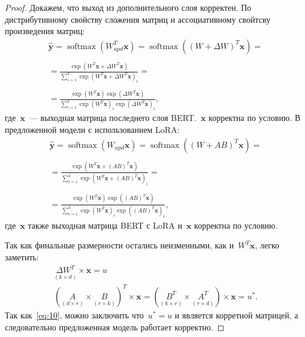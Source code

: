 \begin{proof} 
Докажем, что выход из дополнительного слоя корректен. По дистрибутивному свойству сложения матриц и ассоциативному свойтсву произведения матриц: 
\begin{equation}
\label{eq:9}
\begin{aligned}
\hat{\mathbf{y}} = \operatorname{softmax}\left(W_{upd}^T \mathbf{x}\right) =
\operatorname{softmax}\left((W + \Delta W)^T \mathbf{x}\right) =\\ \\
= \frac{\exp \left(W^T \mathbf{x} + \Delta W^T \mathbf{x}\right)}{\sum_{i=1}^k \exp \left(W^T \mathbf{x} + \Delta W^T \mathbf{x}\right)_i}=\\ \\
= \frac{\exp \left(W^T \mathbf{x}\right) \exp \left(\Delta W^T \mathbf{x}\right)}{\sum_{i=1}^k \exp \left(W^T \mathbf{x}\right)_i \exp \left(\Delta W^T \mathbf{x}\right)_i},
\end{aligned}
\end{equation} 
где~$\mathbf{x}$~--- выходная матрица последнего слоя BERT.~$\mathbf{x}$ корректна по условию. В предложенной модели с использованием LoRA:
\begin{equation}
\label{eq:10}
\begin{aligned}
\hat{\mathbf{y}} = \operatorname{softmax}\left(W_{upd} \mathbf{x}\right) =
\operatorname{softmax}\left((W + AB)^T \mathbf{x}\right) =\\ \\
= \frac{\exp \left(W^T \mathbf{x} + (AB)^T \mathbf{x}\right)}{\sum_{i=1}^k \exp \left(W^T \mathbf{x} + (AB)^T \mathbf{x}\right)_i}=\\ \\
= \frac{\exp \left(W^T \mathbf{x}\right) \exp \left((AB)^T \mathbf{x}\right)}{\sum_{i=1}^k \exp \left(W^T \mathbf{x}\right)_i \exp \left((AB)^T \mathbf{x}\right)_i},
\end{aligned}
\end{equation} 
где~$\mathbf{x}$ также выходная матрица BERT с LoRA и~$\mathbf{x}$ корректна по условию. 

Так как финальные размерности остались неизменными, как и~$W^T\mathbf{x}$, легко заметить: 
\begin{equation}
\label{eq:11}
\begin{aligned}
 \underset{(k \times d)}{\Delta W^T} \times \mathbf{x} = u\\
(\underset{(d \times r)}{A} \times \underset{(r \times k)}{B})^T \times \mathbf{x} = (\underset{(k \times r)}{B^T} \times \underset{(r \times d)}{A^T}) \times \mathbf{x} = u^*.
\end{aligned}
\end{equation}
Так как~\eqref{eq:10}, можно заключить что~${u^*} = {u}$ и является корретной матрицей, а следовательно предложенная модель работает корректно.
\end{proof}
